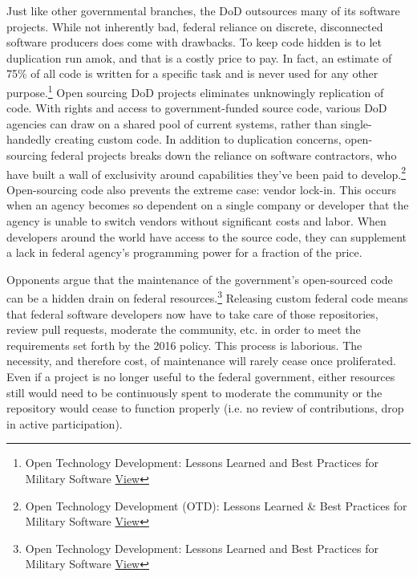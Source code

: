 \documentclass[a4paper]{article}
\begin{document}
	Just like other governmental branches, the DoD outsources many of its software projects. While not inherently bad, federal reliance on discrete, disconnected software producers does come with drawbacks. To keep code hidden is to let duplication run amok, and that is a costly price to pay. In fact, an estimate of 75\% of all code is written for a specific task and is never used for any other purpose.\footnote{Open Technology Development: Lessons Learned and Best Practices for Military Software \href{https://www.netaction.org/opensrc/oss-advantages.html}{View}} Open sourcing DoD projects eliminates unknowingly replication of code. With rights and access to government-funded source code, various DoD agencies can draw on a shared pool of current systems, rather than single-handedly creating custom code. In addition to duplication concerns, open-sourcing federal projects breaks down the reliance on software contractors, who have built a wall of exclusivity around capabilities they've been paid to develop.\footnote{Open Technology Development (OTD): Lessons Learned \& Best Practices for Military Software \href{http://dodcio.defense.gov/Portals/0/Documents/FOSS/OTD-lessons-learned-military-signed.pdf}{View}} Open-sourcing code also prevents the extreme case: vendor lock-in. This occurs when an agency becomes so dependent on a single company or developer that the agency is unable to switch vendors without significant costs and labor. When developers around the world have access to the source code, they can supplement a lack in federal agency's programming power for a fraction of the price.

    Opponents argue that the maintenance of the government's open-sourced code can be a hidden drain on federal resources.\footnote{Open Technology Development: Lessons Learned and Best Practices for Military Software \href{https://www.netaction.org/opensrc/oss-advantages.html}{View}} Releasing custom federal code means that federal software developers now have to take care of those repositories, review pull requests, moderate the community, etc. in order to meet the requirements set forth by the 2016 policy. This process is laborious. The necessity, and therefore cost, of maintenance will rarely cease once proliferated. Even if a project is no longer useful to the federal government, either resources still would need to be continuously spent to moderate the community or the repository would cease to function properly (i.e. no review of contributions, drop in active participation).
\end{document}
